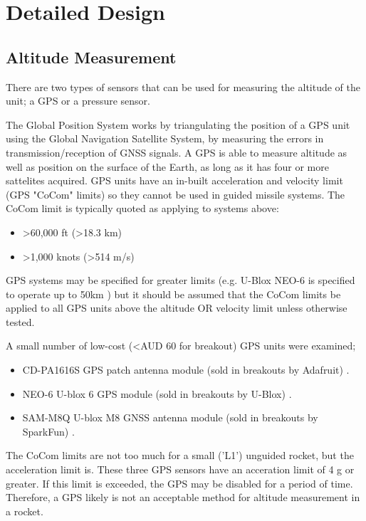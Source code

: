 \documentclass{article}
\begin{document}
\section{Detailed Design}

    \subsection{Altitude Measurement}

        There are two types of sensors that can be used for measuring the altitude of the unit; a GPS or a pressure sensor.

        The Global Position System works by triangulating the position of a GPS unit using the Global Navigation Satellite System, by measuring the errors in transmission/reception of GNSS signals.
        A GPS is able to measure altitude as well as position on the surface of the Earth, as long as it has four or more sattelites acquired.
        GPS units have an in-built acceleration and velocity limit (GPS "CoCom" limits) so they cannot be used in guided missile systems.
        The CoCom limit is typically quoted as applying to systems above:
        \begin{itemize}
            \item >60,000 ft (>18.3 km)
            \item >1,000 knots (>514 m/s)
        \end{itemize}
        GPS systems may be specified for greater limits (e.g. U-Blox NEO-6 is specified to operate up to 50km \cite{ublox-gps1}) but it should be assumed that the CoCom limits be applied to all GPS units above the altitude OR velocity limit unless otherwise tested.

        A small number of low-cost (<AUD 60 for breakout) GPS units were examined;
        \begin{itemize}
            \item CD-PA1616S GPS patch antenna module (sold in breakouts by Adafruit) \cite{cd-gps}.
            \item NEO-6 U-blox 6 GPS module (sold in breakouts by U-Blox) \cite{ublox-gps1}.
            \item SAM-M8Q U-blox M8 GNSS antenna module (sold in breakouts by SparkFun) \cite{ublox-gps2}.
        \end{itemize}

        The CoCom limits are not too much for a small ('L1') unguided rocket, but the acceleration limit is.
        These three GPS sensors have an acceration limit of 4 g or greater.
        If this limit is exceeded, the GPS may be disabled for a period of time.
        Therefore, a GPS likely is not an acceptable method for altitude measurement in a rocket.
\end{document}
